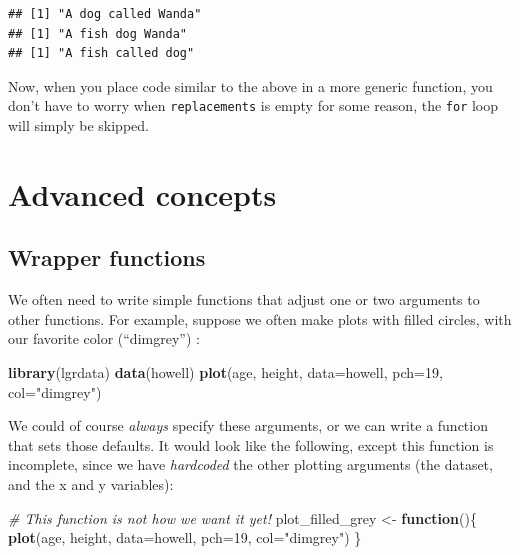 \documentclass[]{book}
\newenvironment{Shaded}{\begin{snugshade}}{\end{snugshade}}
\newcommand{\CommentTok}[1]{\textcolor[rgb]{0.56,0.35,0.01}{\textit{#1}}}
\newcommand{\ControlFlowTok}[1]{\textcolor[rgb]{0.13,0.29,0.53}{\textbf{#1}}}
\newcommand{\DataTypeTok}[1]{\textcolor[rgb]{0.13,0.29,0.53}{#1}}
\newcommand{\DecValTok}[1]{\textcolor[rgb]{0.00,0.00,0.81}{#1}}
\newcommand{\KeywordTok}[1]{\textcolor[rgb]{0.13,0.29,0.53}{\textbf{#1}}}
\newcommand{\NormalTok}[1]{#1}
\newcommand{\StringTok}[1]{\textcolor[rgb]{0.31,0.60,0.02}{#1}}
\begin{document}
\begin{verbatim}
## [1] "A dog called Wanda"
## [1] "A fish dog Wanda"
## [1] "A fish called dog"
\end{verbatim}

Now, when you place code similar to the above in a more generic function, you don't have to worry when \texttt{replacements} is empty for some reason, the \texttt{for} loop will simply be skipped.

\hypertarget{functionsadvanced}{%
\section{Advanced concepts}\label{functionsadvanced}}

\hypertarget{wrapfunctions}{%
\subsection{Wrapper functions}\label{wrapfunctions}}

We often need to write simple functions that adjust one or two arguments to other functions. For example, suppose we often make plots with filled circles, with our favorite color (``dimgrey'') :

\begin{Shaded}
\begin{Highlighting}[]
\KeywordTok{library}\NormalTok{(lgrdata)}
\KeywordTok{data}\NormalTok{(howell)}
\KeywordTok{plot}\NormalTok{(age, height, }\DataTypeTok{data=}\NormalTok{howell, }\DataTypeTok{pch=}\DecValTok{19}\NormalTok{, }\DataTypeTok{col=}\StringTok{"dimgrey"}\NormalTok{)}
\end{Highlighting}
\end{Shaded}

We could of course \emph{always} specify these arguments, or we can write a function that sets those defaults. It would look like the following, except this function is incomplete, since we have \emph{hardcoded} the other plotting arguments (the dataset, and the x and y variables):

\begin{Shaded}
\begin{Highlighting}[]
\CommentTok{# This function is not how we want it yet!}
\NormalTok{plot_filled_grey <-}\StringTok{ }\ControlFlowTok{function}\NormalTok{()\{}
  \KeywordTok{plot}\NormalTok{(age, height, }\DataTypeTok{data=}\NormalTok{howell, }\DataTypeTok{pch=}\DecValTok{19}\NormalTok{, }\DataTypeTok{col=}\StringTok{"dimgrey"}\NormalTok{)}
\NormalTok{\}}
\end{Highlighting}
\end{Shaded}
\end{document}
